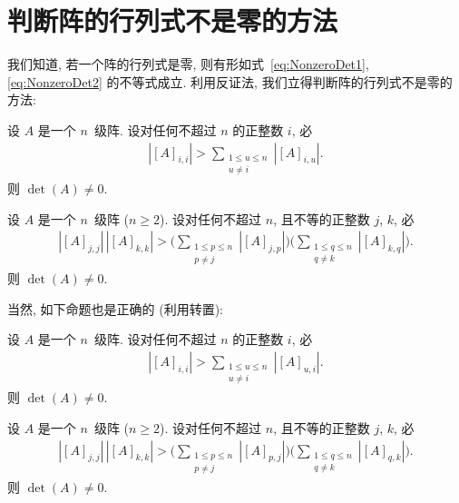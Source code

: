 \section{判断阵的行列式不是零的方法}

我们知道, 若一个阵的行列式是零,
则有形如式~\eqref{eq:NonzeroDet1}, \eqref{eq:NonzeroDet2} 的不等式成立.
利用反证法, 我们立得判断阵的行列式不是零的方法:

\begin{theorem}
    设 \(A\) 是一个 \(n\)~级阵.
    设对任何不超过 \(n\) 的正整数 \(i\), 必
    \begin{align*}
        |[A]_{i,i}| >
        \sum_{\substack{1 \leq u \leq n \\
            u \neq i}} {|[A]_{i,u}|}.
    \end{align*}
    则 \(\det {(A)} \neq 0\).
\end{theorem}

\begin{theorem}
    设 \(A\) 是一个 \(n\)~级阵 (\(n \geq 2\)).
    设对任何不超过 \(n\), 且不等的正整数 \(j\), \(k\), 必
    \begin{align*}
        |[A]_{j,j}|\,|[A]_{k,k}| >
        \Bigg(
        \sum_{\substack{1 \leq p \leq n \\
                p \neq j}} {|[A]_{j,p}|}
        \Bigg)
        \Bigg(
        \sum_{\substack{1 \leq q \leq n \\
                q \neq k}} {|[A]_{k,q}|}
        \Bigg).
    \end{align*}
    则 \(\det {(A)} \neq 0\).
\end{theorem}

当然, 如下命题也是正确的 (利用转置):

\begin{theorem}
    设 \(A\) 是一个 \(n\)~级阵.
    设对任何不超过 \(n\) 的正整数 \(i\), 必
    \begin{align*}
        |[A]_{i,i}| >
        \sum_{\substack{1 \leq u \leq n \\
            u \neq i}} {|[A]_{u,i}|}.
    \end{align*}
    则 \(\det {(A)} \neq 0\).
\end{theorem}

\begin{theorem}
    设 \(A\) 是一个 \(n\)~级阵 (\(n \geq 2\)).
    设对任何不超过 \(n\), 且不等的正整数 \(j\), \(k\), 必
    \begin{align*}
        |[A]_{j,j}|\,|[A]_{k,k}| >
        \Bigg(
        \sum_{\substack{1 \leq p \leq n \\
                p \neq j}} {|[A]_{p,j}|}
        \Bigg)
        \Bigg(
        \sum_{\substack{1 \leq q \leq n \\
                q \neq k}} {|[A]_{q,k}|}
        \Bigg).
    \end{align*}
    则 \(\det {(A)} \neq 0\).
\end{theorem}

